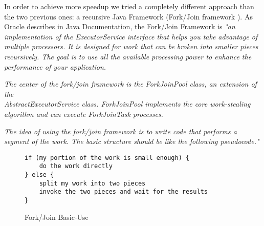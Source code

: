 \documentclass{dithesis}
\begin{document}
        In order to achieve more speedup we tried a completely different approach than the two previous ones: a recursive Java Framework (Fork/Join framework \cite{Oracle Java Fork/Join Framework}). As Oracle describes in Java Documentation, the Fork/Join Framework is
    	\textit{"an implementation of the ExecutorService interface that helps you take advantage of multiple processors. It is designed for work that can be broken into smaller pieces recursively. The goal is to use all the available processing power to enhance the performance of your application.}

		\textit{The center of the fork/join framework is the ForkJoinPool class, an extension of the \\ AbstractExecutorService class. ForkJoinPool implements the core work-stealing algorithm and can execute ForkJoinTask processes.}

    \textit{The idea of using the fork/join framework is to write code that performs a segment of the work. The basic structure should be like the following pseudocode."}

        \begin{figure}[H]
\begin{lstlisting}
if (my portion of the work is small enough) {
    do the work directly
} else {
    split my work into two pieces
    invoke the two pieces and wait for the results
}
\end{lstlisting}
        \caption{Fork/Join Basic-Use}
        \end{figure}
\end{document}
